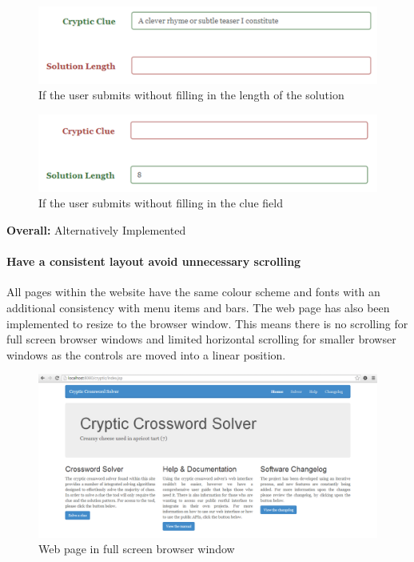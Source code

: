 \begin{figure}[H]
	\centering
	\includegraphics[keepaspectratio=true]{evidence/alert2.png}
	\caption{If the user submits without filling in the length of the solution}
\end{figure}

\begin{figure}[H]
	\centering
	\includegraphics[keepaspectratio=true]{evidence/alert3.png}
	\caption{If the user submits without filling in the clue field}
\end{figure}

{\bf Overall:} Alternatively Implemented


\paragraph{Have a consistent layout avoid unnecessary scrolling}

All pages within the website have the same colour scheme and fonts  with an
additional consistency with menu items and bars. The web page  has also been
implemented to resize to the browser window. This means  there is no scrolling
for full screen browser windows and limited horizontal  scrolling for smaller
browser windows as the controls are moved into a linear  position.

\begin{figure}[H]
	\centering
	\includegraphics[keepaspectratio=true,scale=0.4]{evidence/scrolling.png}
	\caption{Web page in full screen browser window}
\end{figure}


